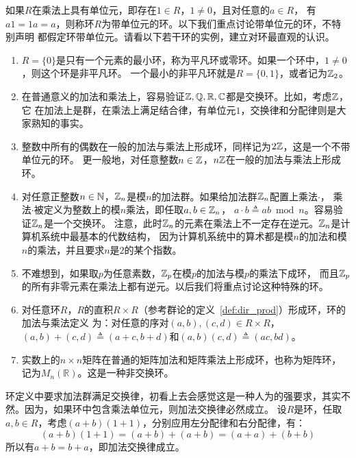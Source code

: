 如果$R$在乘法上具有单位元，即存在$1 \in R$，$1 \neq 0$，且对任意的$a \in R$，
有$a 1 = 1 a = a $，则称环$R$为带单位元的环。以下我们重点讨论带单位元的环，不特别声明
都假定环带单位元。请看以下若干环的实例，建立对环最直观的认识。
\begin{example}
\begin{enumerate}
\item $R = \{0\}$是只有一个元素的最小环，称为平凡环或零环。如果一个环中，$1 \neq 0$，则这个环是非平凡环。
一个最小的非平凡环就是$R = \{0, 1\}$，或者记为${\mathbb Z}_2$。

\item 在普通意义的加法和乘法上，容易验证${\mathbb Z}, \mathbb{Q}, \mathbb{R}, \mathbb{C}$都是交换环。比如，考虑${\mathbb Z}$，它
在加法上是群，在乘法上满足结合律，有单位元$1$，交换律和分配律则是大家熟知的事实。

\item 整数中所有的偶数在一般的加法与乘法上形成环，同样记为$2{\mathbb Z}$，这是一个不带单位元的环。
           更一般地，对任意整数$n\in {\mathbb Z}$，$n{\mathbb Z}$在一般的加法与乘法上形成环。

\item 对任意正整数$n\in {\mathbb N}$，${\mathbb Z}_n$是模$n$的加法群。如果给加法群${\mathbb Z}_n$配置上乘法$\cdot$，
乘法$\cdot$被定义为整数上的模$n$乘法，即任取$a, b \in {\mathbb Z}_n$，
$a \cdot b \triangleq ab\bmod n$。容易验证${\mathbb Z}_n$是一个交换环。
注意，此时${\mathbb Z}_n$的元素在乘法上不一定存在逆元。${\mathbb Z}_n$是计算机系统中最基本的代数结构，
因为计算机系统中的算术都是模$n$的加法和模$n$的乘法，并且要求$n$是$2$的某个指数。

\item 不难想到，如果取$p$为任意素数，${\mathbb Z}_p$在模$p$的加法与模$p$的乘法下成环，
而且${\mathbb Z}_p$的所有非零元素在乘法上都有逆元。以后我们将重点讨论这种特殊的环。

\item 对任意环$R$，$R$的直积$R \times R$（参考群论的定义~\ref{def:dir_prod}）形成环，环的加法与乘法定义
为：对任意的序对$(a,b), (c,d) \in R \times R$，
$(a, b) + (c, d) \triangleq (a+c, b+d)$和$(a, b)  (c, d) \triangleq (ac, bd)$。

\item 实数上的$n \times n$矩阵在普通的矩阵加法和矩阵乘法上形成环，也称为矩阵环，记为$M_n(\mathbb{R})$。这是一种非交换环。
\end{enumerate}
\end{example}

环定义中要求加法群满足交换律，初看上去会感觉这是一种人为的强要求，其实不然。因为，如果环中包含乘法单位元，则加法交换律必然成立。
设$R$是环，任取$a, b \in R$，考虑$(a + b)(1 + 1) $，分别应用左分配律和右分配律，有：
\[(a + b)(1 + 1) = (a + b) + (a + b) = (a + a) + (b + b)  \]
所以有$a + b = b + a$，即加法交换律成立。

